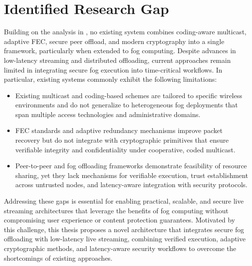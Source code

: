 \section{Identified Research Gap}

\quad Building on the analysis in \textbf{}, no existing system combines coding-aware multicast, adaptive FEC, secure peer offload, and modern cryptography into a single framework, particularly when extended to fog computing. Despite advances in low-latency streaming and distributed offloading, current approaches remain limited in integrating secure fog execution into time-critical workflows. In particular, existing systems commonly exhibit the following limitations:

\begin{itemize}
	\item Existing multicast and coding-based schemes are tailored to specific wireless environments and do not generalize to heterogeneous fog deployments that span multiple access technologies and administrative domains.
	\item FEC standards and adaptive redundancy mechanisms improve packet recovery but do not integrate with cryptographic primitives that ensure verifiable integrity and confidentiality under cooperative, coded multicast.
	\item Peer-to-peer and fog offloading frameworks demonstrate feasibility of resource sharing, yet they lack mechanisms for verifiable execution, trust establishment across untrusted nodes, and latency-aware integration with security protocols.
\end{itemize}


\quad Addressing these gaps is essential for enabling practical, scalable, and secure live streaming architectures that leverage the benefits of fog computing without compromising user experience or content protection guarantees. Motivated by this challenge, this thesis proposes a novel architecture that integrates secure fog offloading with low-latency live streaming, combining verified execution, adaptive cryptographic methods, and latency-aware security workflows to overcome the shortcomings of existing approaches.
